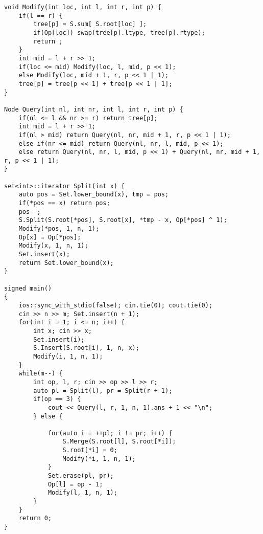 \begin{lstlisting}
void Modify(int loc, int l, int r, int p) {
	if(l == r) {
		tree[p] = S.sum[ S.root[loc] ];
		if(Op[loc]) swap(tree[p].ltype, tree[p].rtype);
		return ;
	}
	int mid = l + r >> 1;
	if(loc <= mid) Modify(loc, l, mid, p << 1);
	else Modify(loc, mid + 1, r, p << 1 | 1);
	tree[p] = tree[p << 1] + tree[p << 1 | 1];
}

Node Query(int nl, int nr, int l, int r, int p) {
	if(nl <= l && nr >= r) return tree[p];
	int mid = l + r >> 1;
	if(nl > mid) return Query(nl, nr, mid + 1, r, p << 1 | 1);
	else if(nr <= mid) return Query(nl, nr, l, mid, p << 1);
	else return Query(nl, nr, l, mid, p << 1) + Query(nl, nr, mid + 1, r, p << 1 | 1);
}

set<int>::iterator Split(int x) {
	auto pos = Set.lower_bound(x), tmp = pos;
	if(*pos == x) return pos;
	pos--;
	S.Split(S.root[*pos], S.root[x], *tmp - x, Op[*pos] ^ 1);
	Modify(*pos, 1, n, 1);
	Op[x] = Op[*pos];
	Modify(x, 1, n, 1);
	Set.insert(x);
	return Set.lower_bound(x);
}

signed main()
{
	ios::sync_with_stdio(false); cin.tie(0); cout.tie(0);
	cin >> n >> m; Set.insert(n + 1);
	for(int i = 1; i <= n; i++) {
		int x; cin >> x;
		Set.insert(i);
		S.Insert(S.root[i], 1, n, x);
		Modify(i, 1, n, 1);
	}
	while(m--) {
		int op, l, r; cin >> op >> l >> r;
		auto pl = Split(l), pr = Split(r + 1);
		if(op == 3) {
			cout << Query(l, r, 1, n, 1).ans + 1 << "\n";
		} else {
			
			for(auto i = ++pl; i != pr; i++) {
				S.Merge(S.root[l], S.root[*i]);
				S.root[*i] = 0;
				Modify(*i, 1, n, 1);
			}
			Set.erase(pl, pr);
			Op[l] = op - 1;
			Modify(l, 1, n, 1);
		}
	}
	return 0;
}
\end{lstlisting}

